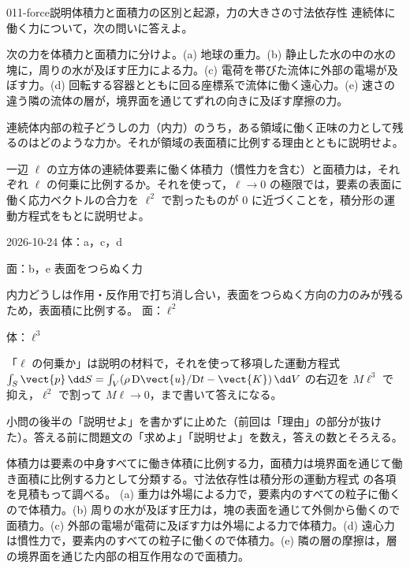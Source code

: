 \documentclass[uplatex,dvipdfmx,a4paper,11pt]{jsarticle}
\begin{document}
\begin{mondai}{011-force}{説明}{体積力と面積力の区別と起源，力の大きさの寸法依存性}
連続体に働く力について，次の問いに答えよ。
\begin{shoumon}
  \item 次の力を体積力と面積力に分けよ。(a) 地球の重力。(b) 静止した水の中の水の塊に，周りの水が及ぼす圧力による力。(c) 電荷を帯びた流体に外部の電場が及ぼす力。(d) 回転する容器とともに回る座標系で流体に働く遠心力。(e) 速さの違う隣の流体の層が，境界面を通じてずれの向きに及ぼす摩擦の力。
  \item 連続体内部の粒子どうしの力（内力）のうち，ある領域に働く正味の力として残るのはどのような力か。それが領域の表面積に比例する理由とともに説明せよ。
  \item 一辺 $\ell$ の立方体の連続体要素に働く体積力（慣性力を含む）と面積力は，それぞれ $\ell$ の何乗に比例するか。それを使って，$\ell\to0$ の極限では，要素の表面に働く応力ベクトルの合力を $\ell^{2}$ で割ったものが $0$ に近づくことを，積分形の運動方程式をもとに説明せよ。
\end{shoumon}
\begin{kotaeutsushi}{2026-10-24}
体：a，c，d

面：b，e
表面をつらぬく力

内力どうしは作用・反作用で打ち消し合い，表面をつらぬく方向の力のみが残るため，表面積に比例する。
面：$\ell^{2}$

体：$\ell^{3}$

\end{kotaeutsushi}
\begin{kizuki}
\item 「$\ell$ の何乗か」は説明の材料で，それを使って移項した運動方程式 $\int_{S}\vect{p}\,\dd S=\int_{V}(\rho\,\mathrm{D}\vect{u}/\mathrm{D}t-\vect{K})\,\dd V$ の右辺を $M\ell^{3}$ で抑え，$\ell^{2}$ で割って $M\ell\to0$，まで書いて答えになる。
\item {} 小問の後半の「説明せよ」を書かずに止めた（前回は「理由」の部分が抜けた）。答える前に問題文の「求めよ」「説明せよ」を数え，答えの数とそろえる。
\end{kizuki}
\begin{tadashii}
\houshin 体積力は要素の中身すべてに働き体積に比例する力，面積力は境界面を通じて働き面積に比例する力として分類する。寸法依存性は積分形の運動方程式  の各項を見積もって調べる。
\keisan {} (a) 重力は外場による力で，要素内のすべての粒子に働くので体積力。(b) 周りの水が及ぼす圧力は，塊の表面を通じて外側から働くので面積力。(c) 外部の電場が電荷に及ぼす力は外場による力で体積力。(d) 遠心力は慣性力で，要素内のすべての粒子に働くので体積力。(e) 隣の層の摩擦は，層の境界面を通じた内部の相互作用なので面積力。


\end{tadashii}
\end{mondai}
\end{document}
